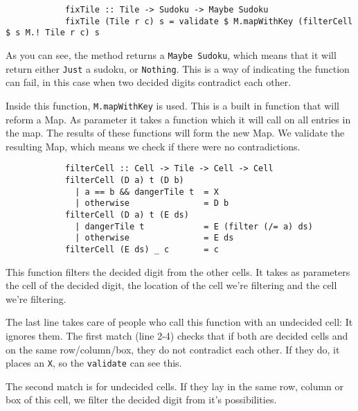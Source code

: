 \documentclass[a4paper,12pt]{article}
\begin{document}
\begin{section}
\begin{subsection}
\begin{subsubsection}
            \begin{lstlisting}
            fixTile :: Tile -> Sudoku -> Maybe Sudoku
            fixTile (Tile r c) s = validate $ M.mapWithKey (filterCell $ s M.! Tile r c) s
            \end{lstlisting}

            As you can see, the method returns a \texttt{Maybe Sudoku}, which
            means that it will return either \texttt{Just} a sudoku, or
            \texttt{Nothing}. This is a way of indicating the function can fail,
            in this case when two decided digits contradict each other.

            Inside this function, \texttt{M.mapWithKey} is used. This is a built
            in function that will reform a Map. As parameter it takes a
            function which it will call on all entries in the map. The results of
            these functions will form the new Map. We validate the resulting
            Map, which means we check if there were no contradictions.

            \begin{lstlisting}
            filterCell :: Cell -> Tile -> Cell -> Cell
            filterCell (D a) t (D b)
              | a == b && dangerTile t  = X
              | otherwise               = D b
            filterCell (D a) t (E ds)
              | dangerTile t            = E (filter (/= a) ds)
              | otherwise               = E ds
            filterCell (E ds) _ c       = c
            \end{lstlisting}

            This function filters the decided digit from the other cells. It
            takes as parameters the cell of the decided digit, the location of
            the cell we're filtering and the cell we're filtering.

            The last line takes care of people who call this function with an
            undecided cell: It ignores them. The first match (line 2-4) checks
            that if both are decided cells and on the same row/column/box, they
            do not contradict each other. If they do, it places an \texttt{X},
            so the \texttt{validate} can see this.

            The second match is for undecided cells. If they lay in the same
            row, column or box of this cell, we filter the decided digit from
            it's possibilities.

        \end{subsubsection}



\end{subsection}
\end{section}
\end{document}
